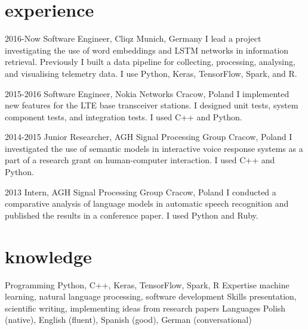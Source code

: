 \documentclass[]{friggeri-cv_osx}
\begin{document}
\section{experience}
\begin{entrylist}
\entry
{2016-Now}
{Software Engineer, Cliqz}
{Munich, Germany}
{I lead a project investigating the use of word embeddings and LSTM networks in information retrieval. Previously I built a data pipeline for collecting, processing, analysing, and visualising telemetry data. I use Python, Keras, TensorFlow, Spark, and R.\\}

\entry
{2015-2016}
{Software Engineer, Nokia Networks}
{Cracow, Poland}
{I implemented new features for the LTE base transceiver stations. I designed unit tests, system component tests, and integration tests. I used C++ and Python.\\}

\entry
{2014-2015}
{Junior Researcher, AGH Signal Processing Group}
{Cracow, Poland}
{I investigated the use of semantic models in interactive voice response systems as a part of a research grant on human-computer interaction. I used C++ and Python.\\}

\entry
{2013}
{Intern, AGH Signal Processing Group}
{Cracow, Poland}
{I conducted a comparative analysis of language models in automatic speech recognition and published the results in a conference paper. I used Python and Ruby.\\}
\end{entrylist}

\section{knowledge}
\begin{entrylist}
\entry
{}
{Programming}
{}
{Python, C++, Keras, TensorFlow, Spark, R}
\entry
{}
{Expertise}
{}
{machine learning, natural language processing, software development}
\entry
{}
{Skills}
{}
{presentation, scientific writing, implementing ideas from research papers}
\entry
{}
{Languages}
{}
{Polish (native), English (fluent), Spanish (good), German (conversational)}
\end{entrylist}
\end{document}
